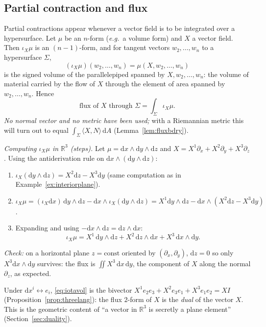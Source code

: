\documentclass[11pt,a4paper]{article}
\numberwithin{equation}{section}
\theoremstyle{definition}
\theoremstyle{plain}
\newcommand{\R}{\mathbb{R}}
\newcommand{\dd}{\mathrm{d}}
\newcommand{\eg}{\emph{e.g.}\ }
\newcommand{\pss}{I}
\begin{document}
\subsection{Partial contraction and flux}\label{sec:flux}

Partial contractions appear whenever a vector field is to be integrated over a hypersurface. Let $\mu$ be an $n$-form (\eg a volume form) and $X$ a vector field. Then $\iota_X\mu$ is an $(n-1)$-form, and for tangent vectors $w_2,\dots,w_n$ to a hypersurface $\Sigma$,
\[
(\iota_X\mu)(w_2,\dots,w_n)=\mu(X,w_2,\dots,w_n)
\]
is the signed volume of the parallelepiped spanned by $X,w_2,\dots,w_n$: the volume of material carried by the flow of $X$ through the element of area spanned by $w_2,\dots,w_n$. Hence
\begin{equation}\label{eq:flux}
\text{flux of }X\text{ through }\Sigma=\int_\Sigma\iota_X\mu .
\end{equation}
\emph{No normal vector and no metric have been used;} with a Riemannian metric this will turn out to equal $\int_\Sigma\langle X,N\rangle\,\dd A$ (Lemma~\ref{lem:fluxbdry}).

\emph{Computing $\iota_X\mu$ in $\R^3$ (steps).} Let $\mu=\dd x\wedge\dd y\wedge\dd z$ and $X=X^1\partial_x+X^2\partial_y+X^3\partial_z$. Using the antiderivation rule on $\dd x\wedge(\dd y\wedge\dd z)$:
\begin{enumerate}
\item $\iota_X(\dd y\wedge\dd z)=X^2\dd z-X^3\dd y$ (same computation as in Example~\ref{ex:interiorplane}).
\item $\iota_X\mu=(\iota_X\dd x)\,\dd y\wedge\dd z-\dd x\wedge\iota_X(\dd y\wedge\dd z)=X^1\dd y\wedge\dd z-\dd x\wedge(X^2\dd z-X^3\dd y)$.
\item Expanding and using $-\dd x\wedge\dd z=\dd z\wedge\dd x$:
\begin{equation}\label{eq:iotavol}
\iota_X\mu=X^1\,\dd y\wedge\dd z+X^2\,\dd z\wedge\dd x+X^3\,\dd x\wedge\dd y .
\end{equation}
\end{enumerate}
\emph{Check:} on a horizontal plane $z=\mathrm{const}$ oriented by $(\partial_x,\partial_y)$, $\dd z=0$ so only $X^3\dd x\wedge\dd y$ survives: the flux is $\iint X^3\,\dd x\,\dd y$, the component of $X$ along the normal $\partial_z$, as expected.

\begin{synthesis}
Under $\dd x^i\leftrightarrow e_i$, \eqref{eq:iotavol} is the bivector $X^1e_2e_3+X^2e_3e_1+X^3e_1e_2=X\pss$ (Proposition~\ref{prop:threelang}): the flux $2$-form of $X$ is the \emph{dual} of the vector $X$. This is the geometric content of ``a vector in $\R^3$ is secretly a plane element'' (Section~\ref{sec:duality}).
\end{synthesis}
\end{document}
